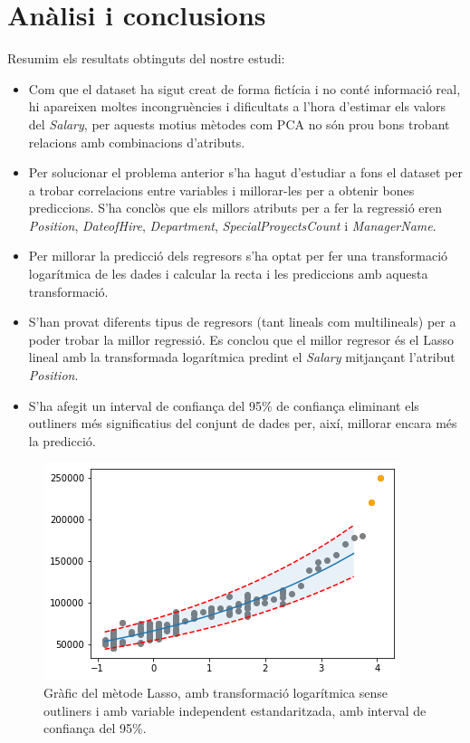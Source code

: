 \documentclass[a4paper, 11pt]{article}
\begin{document}
\newpage
\section{Anàlisi i conclusions}
Resumim els resultats obtinguts del nostre estudi:
\begin{itemize}
    \item Com que el dataset ha sigut creat de forma fictícia i no conté informació real, hi apareixen moltes incongruències i dificultats a l'hora d'estimar els valors del \textit{Salary}, per aquests motius mètodes com PCA no són prou bons trobant relacions amb combinacions d'atributs.
    \item Per solucionar el problema anterior s'ha hagut d'estudiar a fons el dataset per a trobar correlacions entre variables i millorar-les per a obtenir bones prediccions. S'ha conclòs que els millors atributs per a fer la regressió eren \textit{Position}, \textit{DateofHire}, \textit{Department}, \textit{SpecialProyectsCount} i \textit{ManagerName}.
    \item Per millorar la predicció dels regresors s'ha optat per fer una transformació logarítmica de les dades i calcular la recta i les prediccions amb aquesta transformació.
    \item S'han provat diferents tipus de regresors (tant lineals com multilineals) per a poder trobar la millor regressió. Es conclou que el millor regresor és el Lasso lineal amb la transformada logarítmica predint el \textit{Salary} mitjançant l'atribut \textit{Position}.
    \item S'ha afegit un interval de confiança del 95\% de confiança eliminant els outliners més significatius del conjunt de dades per, així, millorar encara més la predicció.
\end{itemize}
\begin{figure}[h]
    \centering
    \includegraphics{lasso/95posicion_sin_outliner_regression.png}
    \caption{Gràfic del mètode Lasso, amb transformació logarítmica sense outliners i amb variable independent estandaritzada, amb interval de confiança del 95\%.}
    \label{fig:my_label}
\end{figure}
\end{document}
